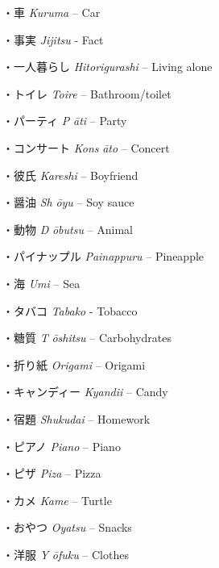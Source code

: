 \par{・車 \emph{Kuruma }– Car }

\par{・事実 \emph{Jijitsu }- Fact }

\par{・一人暮らし \emph{Hitorigurashi }– Living alone }

\par{・トイレ \emph{Toire }– Bathroom\slash toilet }

\par{・パーティ \emph{P }\emph{āti }– Party }

\par{・コンサート \emph{Kons }\emph{āto }– Concert }

\par{・彼氏 \emph{Kareshi }– Boyfriend }

\par{・醤油 \emph{Sh }\emph{ōyu }– Soy sauce }

\par{・動物 \emph{D }\emph{ōbutsu }– Animal }

\par{・パイナップル \emph{Painappuru }– Pineapple }

\par{・海 \emph{Umi }– Sea }

\par{・タバコ \emph{Tabako }- Tobacco }

\par{・糖質 \emph{T }\emph{ōshitsu }– Carbohydrates }

\par{・折り紙 \emph{Origami }– Origami }

\par{・キャンディー \emph{Kyandii }– Candy }

\par{・宿題 \emph{Shukudai }– Homework }

\par{・ピアノ \emph{Piano }– Piano }

\par{・ピザ \emph{Piza }– Pizza }

\par{・カメ \emph{Kame }– Turtle }

\par{・おやつ \emph{Oyatsu }– Snacks }

\par{・洋服 \emph{Y }\emph{ōfuku }– Clothes }

